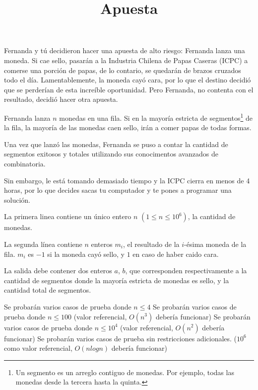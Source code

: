 \documentclass{oci}
\title{Apuesta}
\begin{document}
\begin{problemDescription}
Fernanda y tú decidieron hacer una apuesta de alto riesgo: Fernanda lanza una moneda. Si cae sello, pasarán a la Industria Chilena de Papas Caseras (ICPC) a comerse una porción de papas, de lo contario, se quedarán de brazos cruzados todo el día.
Lamentablemente, la moneda cayó cara, por lo que el destino decidió que se perderían de esta increíble oportunidad. Pero Fernanda, no contenta con el resultado, decidió hacer otra apuesta.

	Fernanda lanza $n$ monedas en una fila. Si en la mayoría estricta de segmentos\footnote{Un segmento es un arreglo contiguo de monedas. Por ejemplo, todas las monedas desde la tercera hasta la quinta.} de la fila, la mayoría de las monedas caen sello, irán a comer papas de todas formas.

Una vez que lanzó las monedas, Fernanda se puso a contar la cantidad de segmentos exitosos y totales utilizando sus conocimentos avanzados de combinatoria.

Sin embargo, le está tomando demasiado tiempo y la ICPC cierra en menos de 4 horas, por lo que decides sacas tu computador y te pones a programar una solución.
\end{problemDescription}

\begin{inputDescription}
	La primera linea contiene un único entero $n$ $(1 \leq n \leq 10^6)$, la cantidad de monedas.

La segunda línea contiene $n$ enteros $m_i$, el resultado de la $i$-ésima moneda de la fila. $m_i$ es $-1$ si la moneda cayó sello, y $1$ en caso de haber caido cara.
\end{inputDescription}

\begin{outputDescription}
	La salida debe contener dos enteros $a$, $b$, que corresponden respectivamente a la cantidad de segmentos donde la mayoría estricta de monedas es sello, y la cantidad total de segmentos.
\end{outputDescription}

\begin{scoreDescription}
	 Se probarán varios casos de prueba donde $n \leq 4$
	 Se probarán varios casos de prueba donde $n \leq 100$ (valor referencial, $O(n^3)$ debería funcionar)
  	 Se probarán varios casos de prueba donde $n \leq 10^4$ (valor referencial, $O(n^2)$ debería funcionar)
	 Se probarán varios casos de prueba sin restricciones adicionales. ($10^6$ como valor referencial, $O(n log n)$ debería funcionar)
\end{scoreDescription}

\begin{sampleDescription}
\end{sampleDescription}
\end{document}
